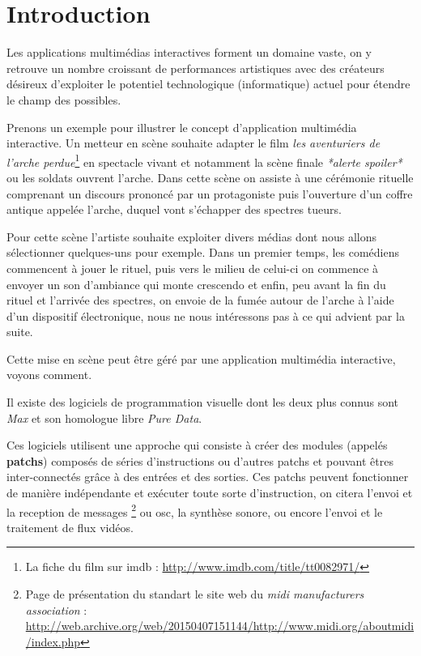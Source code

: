 \chapter*{Introduction}

Les applications multimédias interactives forment un domaine vaste, on y retrouve un nombre croissant de performances artistiques avec des créateurs désireux d'exploiter le potentiel technologique (informatique) actuel pour étendre le champ des possibles.

Prenons un exemple pour illustrer le concept d'application multimédia interactive. Un metteur en scène souhaite adapter le film \emph{les aventuriers de l'arche perdue}\footnote{La fiche du film sur imdb : \url{http://www.imdb.com/title/tt0082971/}} en spectacle vivant et notamment la scène finale \emph{*alerte spoiler*} ou les soldats ouvrent l'arche. Dans cette scène on assiste à une cérémonie rituelle comprenant un discours prononcé par un protagoniste puis l'ouverture d'un coffre antique appelée l'arche, duquel vont s'échapper des spectres tueurs.

Pour cette scène l'artiste souhaite exploiter divers médias dont nous allons sélectionner quelques-uns pour exemple.
%
Dans un premier temps, les comédiens commencent à jouer le rituel, puis vers le milieu de celui-ci on commence à envoyer un son d'ambiance qui monte crescendo et enfin, peu avant la fin du rituel et l'arrivée des spectres, on envoie de la fumée autour de l'arche à l'aide d'un dispositif électronique, nous ne nous intéressons pas à ce qui advient par la suite.

Cette mise en scène  peut être géré par une application multimédia interactive, voyons comment.


Il existe des logiciels de programmation visuelle\cite{Cycling742015}\cite{Pure2015} dont les deux plus connus sont \emph{Max} et son homologue libre \emph{Pure Data}.

Ces logiciels utilisent une approche qui consiste à créer des modules (appelés \textbf{\glspl{patch}}) composés de séries d'instructions ou d'autres \glspl{patch} et pouvant êtres inter-connectés grâce à des entrées et des sorties.
%
Ces patchs peuvent fonctionner de manière indépendante et exécuter toute sorte d'instruction, on citera l'envoi et la reception de messages \midi{}\footnote{Page de présentation du standart \midi{} le site web du \emph{midi manufacturers association} : \url{http://web.archive.org/web/20150407151144/http://www.midi.org/aboutmidi/index.php} \archive{}} ou \acrfull{osc}\cite{osc2002conf}, la synthèse sonore, ou encore l'envoi et le traitement de flux vidéos.

